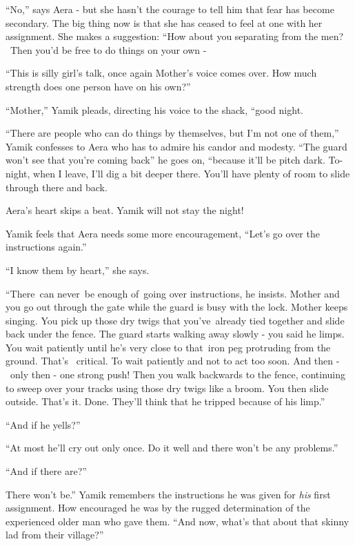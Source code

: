 \documentclass[12pt]{book}
\begin{document}
{}``No,'' says Aera -{ }but she hasn't the courage to tell him that fear has
become secondary. The big thing now is that she has ceased to feel at one with her assignment. She makes a suggestion:
``How about you separating from the men? \ Then you'd be free to do things on your own -{\textquotedbl}

{}``This is silly girl's talk,{\textquotedbl} once again Mother's voice comes over. {\textquotedbl}How much strength
does one person have on his own?''

{}``Mother,'' Yamik pleads, directing his voice to the shack, ``good night.{\textquotedbl}

{}``There are people who can do things by themselves, but I'm not one of them,''
Yamik{ }confesses to Aera who has to admire his candor and modesty. ``The guard
won't see that you're coming back'' he goes on, ``because it'll be pitch dark. To-night, when I leave, I'll dig a bit
deeper there. You'll have plenty of room to slide through there and back.{\textquotedbl}

Aera's heart skips a beat. Yamik will not stay the night!

Yamik feels that Aera needs some more encouragement, ``Let's go over the instructions again.''

{}``I know them by heart,'' she says.

{}``There~can never~be enough of~going over instructions,{\textquotedbl} he insists. {\textquotedbl}Mother and you go
out through the gate while the guard is busy with the lock. Mother keeps singing. You pick up those dry twigs that
you've~already tied together and slide back under the fence. The guard starts walking away slowly
{{}- }you said he limps. You wait patiently until he's very close to that~iron
peg protruding from the ground. That's \ critical. To wait patiently and not to act too soon. And then - \ only then -
one strong push! Then you walk backwards to the fence, continuing to sweep over your tracks using those dry
twigs{ }like a broom. You then slide outside. That's it. Done. They'll think
that he tripped{ }because of his limp.''

{}``And if he yells?''

{}``At most he'll cry out only once. Do it well and there won't be any problems.''

{}``And if there are?''

{\textquotedbl}There won't be.'' Yamik remembers the instructions he was given for \textit{his} first assignment. How
encouraged he was by the rugged determination of the experienced older man who gave them. ``And now, what's that about
that skinny lad from their village?''
\end{document}
